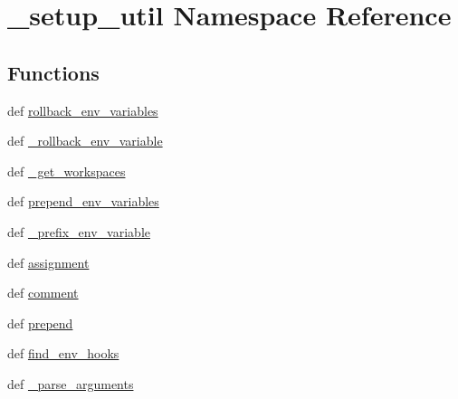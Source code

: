 \hypertarget{namespace__setup__util}{\section{\-\_\-setup\-\_\-util Namespace Reference}
\label{namespace__setup__util}
}
\subsection*{Functions}
\begin{DoxyCompactItemize}
\item 
def \hyperlink{namespace__setup__util_a5b1728beb6e19ccf126bf9e02de6083e}{rollback\-\_\-env\-\_\-variables}
\item 
def \hyperlink{namespace__setup__util_a93f66029f749da0fa9796a4247778677}{\-\_\-rollback\-\_\-env\-\_\-variable}
\item 
def \hyperlink{namespace__setup__util_a4bc0c7ebbb559ce956160349b3077301}{\-\_\-get\-\_\-workspaces}
\item 
def \hyperlink{namespace__setup__util_a44654f701304ecab7e37798abf014d1a}{prepend\-\_\-env\-\_\-variables}
\item 
def \hyperlink{namespace__setup__util_a0d916ad34eea6871514c36f6e928d431}{\-\_\-prefix\-\_\-env\-\_\-variable}
\item 
def \hyperlink{namespace__setup__util_a7983d4ea2ecdeaf54e133950d8a76e77}{assignment}
\item 
def \hyperlink{namespace__setup__util_a9d73115db9efca5c20b575f96b9eb065}{comment}
\item 
def \hyperlink{namespace__setup__util_a4ced140c2841c9a3e692bf39d98aa9eb}{prepend}
\item 
def \hyperlink{namespace__setup__util_aad4a41589ebc32e81406c63db26e721a}{find\-\_\-env\-\_\-hooks}
\item 
def \hyperlink{namespace__setup__util_a68bdee5b1b36ce340607c5f122fc04ff}{\-\_\-parse\-\_\-arguments}
\end{DoxyCompactItemize}
